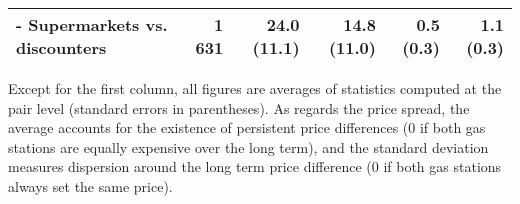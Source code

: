 \documentclass[english]{article}
\begin{document}
\begin{table}[H]
\begin{threeparttable}
\begin{tabular}{lrrrrr}
    - Supermarkets vs. discounters & 1 631 & 24.0 (11.1) & 14.8 (11.0) & 0.5 (0.3) & 1.1 (0.3) \\
    \bottomrule
    \bottomrule
\end{tabular}
\begin{tablenotes}
			\small
      \item Except for the first column, all figures are averages of statistics computed at the pair level (standard errors in parentheses). As regards the price spread, the average accounts for the existence of persistent price differences (0 if both gas stations are equally expensive over the long term), and the standard deviation measures dispersion around the long term price difference (0 if both gas stations always set the same price).
\end{tablenotes}
\end{threeparttable}
\end{table}
\end{document}
